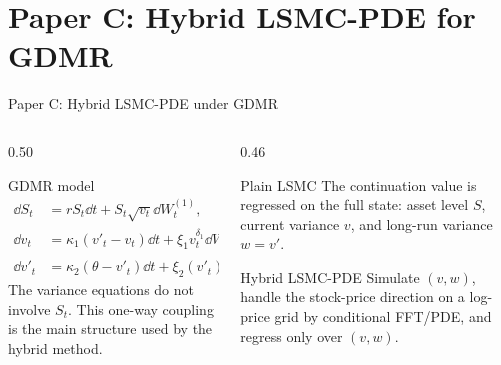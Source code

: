 \section{Paper C: Hybrid LSMC-PDE for GDMR}

\begin{frame}{Paper C: Hybrid LSMC-PDE under GDMR}
  \begin{columns}[T,onlytextwidth]
    \begin{column}{0.50\textwidth}
      \begin{block}{GDMR model}
        {\scriptsize
        \[
        \begin{aligned}
        \dd S_t &= rS_t\dd t+S_t\sqrt{v_t}\dd W_t^{(1)},\\
        \dd v_t &= \kappa_1(v'_t-v_t)\dd t+\xi_1v_t^{\delta_1}\dd W_t^{(2)},\\
        \dd v'_t &= \kappa_2(\theta-v'_t)\dd t+\xi_2(v'_t)^{\delta_2}\dd W_t^{(3)}.
        \end{aligned}
        \]}
        {\small The variance equations do not involve \(S_t\). This one-way coupling is the main structure used by the hybrid method.}
      \end{block}
    \end{column}
    \begin{column}{0.46\textwidth}
      \begin{block}{Plain LSMC}
        The continuation value is regressed on the full state: asset level \(S\), current variance \(v\), and long-run variance \(w=v'\).
      \end{block}
      \begin{block}{Hybrid LSMC-PDE}
        Simulate \((v,w)\), handle the stock-price direction on a log-price grid by conditional FFT/PDE, and regress only over \((v,w)\).
      \end{block}
    \end{column}
  \end{columns}

  \vspace{0.35em}
\end{frame}

